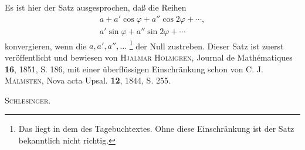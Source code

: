 \medskip\begingroup\small
\renewcommand{\thefootnote}{**)}
\indent Es ist hier der Satz ausgesprochen, daß die Reihen
\[
\begin{aligned}
a+a'\cos\varphi+a''\cos2\varphi+\cdots,\\
a'\sin\varphi+a''\sin2\varphi+\cdots
\end{aligned}
\]
\noindent konvergieren, wenn die \(a,a',a'',\ldots\) \footnote{Das liegt in dem  des Tagebuchtextes. Ohne diese Einschränkung ist der Satz bekanntlich nicht richtig.} der Null zustreben. Dieser Satz ist zuerst veröffentlicht und bewiesen von \textsc{Hjalmar Holmgren}, Journal de Mathématiques \textbf{16}, 1851, S. 186, mit einer überflüssigen Einschränkung schon von \textsc{C. J. Malmsten}, Nova acta Upsal. \textbf{12}, 1844, S. 255.
\par\noindent\hfill\textsc{Schlesinger.}
\par\endgroup
